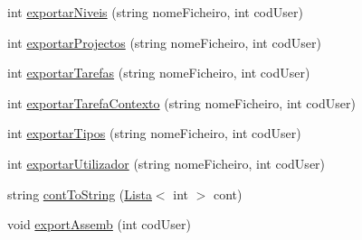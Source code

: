 \begin{DoxyCompactItemize}
int \hyperlink{class_c_s_v_a48a6d79cc0df7d7b4ff1583ad1ec3b25}{exportar\-Niveis} (string nome\-Ficheiro, int cod\-User)
\item 
int \hyperlink{class_c_s_v_a263fcbe17e1338baa8c2cd442a827807}{exportar\-Projectos} (string nome\-Ficheiro, int cod\-User)
\item 
int \hyperlink{class_c_s_v_a2021cd698dc219abf11a67c014cd2643}{exportar\-Tarefas} (string nome\-Ficheiro, int cod\-User)
\item 
int \hyperlink{class_c_s_v_a0ecb0d14f03323c653ca564549745c42}{exportar\-Tarefa\-Contexto} (string nome\-Ficheiro, int cod\-User)
\item 
int \hyperlink{class_c_s_v_acfcbe9637bae0646756a321a82b0bea1}{exportar\-Tipos} (string nome\-Ficheiro, int cod\-User)
\item 
int \hyperlink{class_c_s_v_aa5600c13c2615829b765b80cb74f23bf}{exportar\-Utilizador} (string nome\-Ficheiro, int cod\-User)
\item 
string \hyperlink{class_c_s_v_a1bafac92cb2c567beebad7350822cf03}{cont\-To\-String} (\hyperlink{class_lista}{Lista}$<$ int $>$ cont)
\item 
void \hyperlink{class_c_s_v_a2ae60e98278829bb8967d35e90e5c9f8}{export\-Assemb} (int cod\-User)
\end{DoxyCompactItemize}


